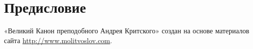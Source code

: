 \chapter*{Предисловие}

«Великий Канон преподобного Андрея Критского» создан на основе материалов сайта \url{http://www.molitvoslov.com}.

